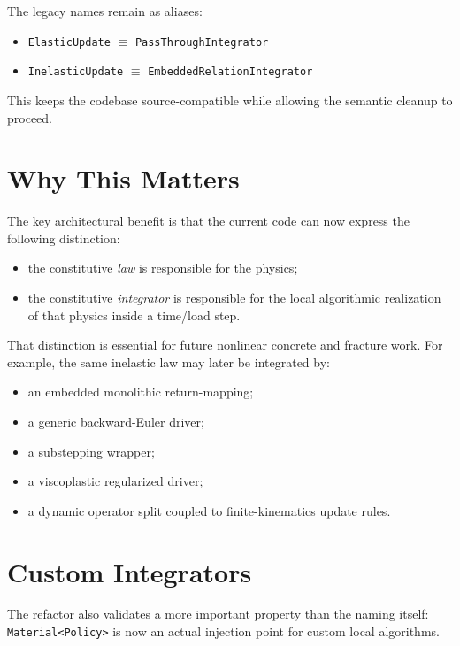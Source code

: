 The legacy names remain as aliases:

\begin{itemize}
  \item \texttt{ElasticUpdate} $\equiv$ \texttt{PassThroughIntegrator}
  \item \texttt{InelasticUpdate} $\equiv$ \texttt{EmbeddedRelationIntegrator}
\end{itemize}

This keeps the codebase source-compatible while allowing the semantic cleanup
to proceed.

\section{Why This Matters}

The key architectural benefit is that the current code can now express the
following distinction:

\begin{itemize}
  \item the constitutive \emph{law} is responsible for the physics;
  \item the constitutive \emph{integrator} is responsible for the local
        algorithmic realization of that physics inside a time/load step.
\end{itemize}

That distinction is essential for future nonlinear concrete and fracture work.
For example, the same inelastic law may later be integrated by:

\begin{itemize}
  \item an embedded monolithic return-mapping;
  \item a generic backward-Euler driver;
  \item a substepping wrapper;
  \item a viscoplastic regularized driver;
  \item a dynamic operator split coupled to finite-kinematics update rules.
\end{itemize}

\section{Custom Integrators}

The refactor also validates a more important property than the naming itself:
\texttt{Material<Policy>} is now an actual injection point for custom local
algorithms.

